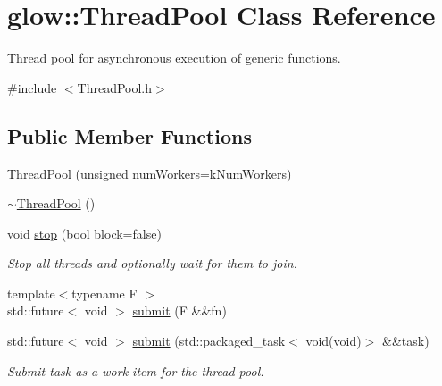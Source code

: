 \hypertarget{classglow_1_1_thread_pool}{}\section{glow\+:\+:Thread\+Pool Class Reference}
\label{classglow_1_1_thread_pool}


Thread pool for asynchronous execution of generic functions.  




{\ttfamily \#include $<$Thread\+Pool.\+h$>$}

\subsection*{Public Member Functions}
\begin{DoxyCompactItemize}
\item 
\hyperlink{classglow_1_1_thread_pool_ab10100ee1172c075fd38583f1a194080}{Thread\+Pool} (unsigned num\+Workers=k\+Num\+Workers)
\item 
\hyperlink{classglow_1_1_thread_pool_aa2b1e452ea6045331c2f26b247558dd5}{$\sim$\+Thread\+Pool} ()
\item 
\mbox{\label{classglow_1_1_thread_pool_ac98310c2bf46b65a5d381b517ce69e1a}} 
void \hyperlink{classglow_1_1_thread_pool_ac98310c2bf46b65a5d381b517ce69e1a}{stop} (bool block=false)
\begin{DoxyCompactList}\small\item\em Stop all threads and optionally wait for them to join. \end{DoxyCompactList}\item 
{\footnotesize template$<$typename F $>$ }\\std\+::future$<$ void $>$ \hyperlink{classglow_1_1_thread_pool_a3ec94a4373c5a4380c28d75bfb61e3ac}{submit} (F \&\&fn)
\item 
\mbox{\label{classglow_1_1_thread_pool_ac766376d0bbf7f48b62f74622c53dcf2}} 
std\+::future$<$ void $>$ \hyperlink{classglow_1_1_thread_pool_ac766376d0bbf7f48b62f74622c53dcf2}{submit} (std\+::packaged\+\_\+task$<$ void(void)$>$ \&\&task)
\begin{DoxyCompactList}\small\item\em Submit {\ttfamily task} as a work item for the thread pool. \end{DoxyCompactList}\item 

\end{DoxyCompactItemize}
